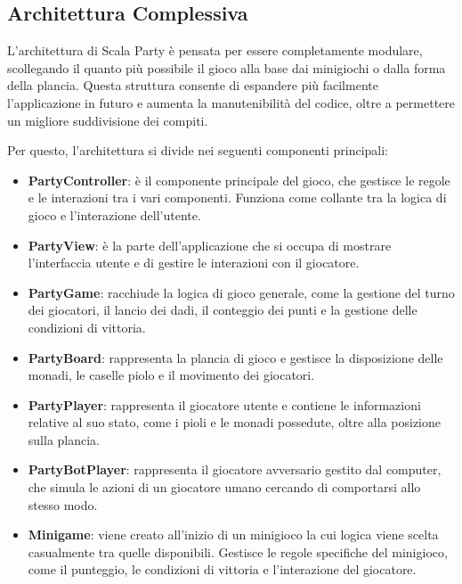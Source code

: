 \subsection{Architettura Complessiva} \label{sec:overall-architecture}
L'architettura di Scala Party è pensata per essere completamente modulare, scollegando 
il quanto più possibile il gioco alla base dai minigiochi o dalla forma della 
plancia. Questa struttura consente di espandere più facilmente l'applicazione in futuro e 
aumenta la manutenibilità del codice, oltre a permettere un migliore suddivisione dei 
compiti.

Per questo, l'architettura si divide nei seguenti componenti principali:
\begin{itemize}
    \item \textbf{PartyController}: è il componente principale del gioco, che gestisce le
    regole e le interazioni tra i vari componenti. Funziona come collante tra la
    logica di gioco e l'interazione dell'utente.
    \item \textbf{PartyView}: è la parte dell'applicazione che si occupa di mostrare
    l'interfaccia utente e di gestire le interazioni con il giocatore.
    \item \textbf{PartyGame}: racchiude la logica di gioco generale, come la gestione
    del turno dei giocatori, il lancio dei dadi, il conteggio dei punti e la gestione 
    delle condizioni di vittoria.
    \item \textbf{PartyBoard}: rappresenta la plancia di gioco e gestisce la disposizione
    delle monadi, le caselle piolo e il movimento dei giocatori.
    \item \textbf{PartyPlayer}: rappresenta il giocatore utente e contiene le informazioni
    relative al suo stato, come i pioli e le monadi possedute, oltre alla posizione sulla
    plancia.
    \item \textbf{PartyBotPlayer}: rappresenta il giocatore avversario gestito dal computer, 
    che simula le azioni di un giocatore umano cercando di comportarsi allo stesso modo.
    \item \textbf{Minigame}: viene creato all'inizio di un minigioco la cui logica viene
    scelta casualmente tra quelle disponibili. Gestisce le regole specifiche del
    minigioco, come il punteggio, le condizioni di vittoria e l'interazione del giocatore.
\end{itemize}

